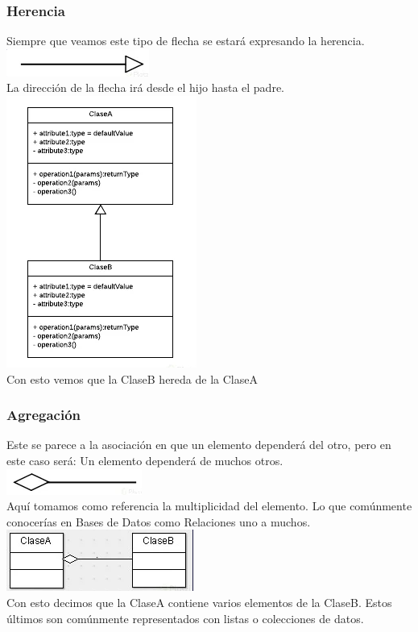 \documentclass[executivepaper]{article}
\begin{document}
\subsubsection{Herencia}
Siempre que veamos este tipo de flecha se estará expresando la herencia.\\
\includegraphics[scale=0.5]{2.4.png}\\
La dirección de la flecha irá desde el hijo hasta el padre.\\
\includegraphics[scale=0.5]{2.5.png}\\
Con esto vemos que la ClaseB hereda de la ClaseA
\subsubsection{Agregación}
Este se parece a la asociación en que un elemento dependerá del otro, pero en este caso será: Un elemento dependerá de muchos otros.\\
\includegraphics[scale=0.5]{2.6.png}\\
Aquí tomamos como referencia la multiplicidad del elemento. Lo que comúnmente conocerías en Bases de Datos como Relaciones uno a muchos.\\
\includegraphics[scale=0.5]{2.7.png}\\
Con esto decimos que la ClaseA contiene varios elementos de la ClaseB. Estos últimos son comúnmente representados con listas o colecciones de datos.
\end{document}

